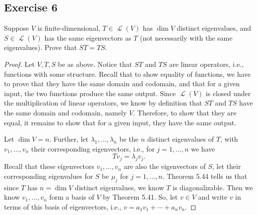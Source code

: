 \documentclass[letterpaper, 12pt]{amsart}
\DeclareMathOperator{\Ell}{\mathscr{L}}				%
\theoremstyle{definition}  							%
\begin{document}
		\subsection*{Exercise 6}
		Suppose $V$ is finite-dimensional, $T \in \Ell(V)$ has $\dim V$ distinct eigenvalues, and $S \in \Ell(V)$ has the same eigenvectors as $T$ (not necessarily with the same eigenvalues). 
		Prove that $ST = TS$.
		\vspace*{3mm}

		\begin{proof}
		Let $V,T,S$ be as above.
		Notice that $ST$ and $TS$ are linear operators, i.e., functions with some structure.
		Recall that to show equality of functions, we have to prove that they have the same domain and codomain, and that for a given input, the two functions produce the same output.
		Since $\Ell(V)$ is closed under the multiplication of linear operators, we know by definition that $ST$ and $TS$ have the same domain and codomain, namely $V$. Therefore, to show that they are equal, it remains to show that for a given input, they have the same output.

		Let $\dim V = n$.
		Further, let $\lambda_{1}, \dots, \lambda_{n}$ be the $n$ distinct eigenvalues of $T$, with $v_{1}, \dots, v_{n}$ their corresponding eigenvectors, i.e., for $j = 1,\dots,n$ we have $$Tv_{j} = \lambda_{j}v_{j}.$$
		Recall that these eigenvectors $v_{1}, \dots, v_{n}$ are also the eigenvectors of $S$, let their corresponding eigenvalues for $S$ be $\mu_{j}$ for $j=1,\dots,n$.
		Theorem 5.44 tells us that since $T$ has $n = \dim V$ distinct eigenvalues, we know $T$ is diagonalizable.
		Then we know $v_{1}, \dots, v_{n}$ form a basis of $V$ by Theorem 5.41. 
		So, let $v \in V$ and write $v$ in terms of this basis of eigenvectors, i.e., $v = a_{1}v_{1} + \cdots + a_{n}v_{n}$.


\end{proof}
\end{document}
